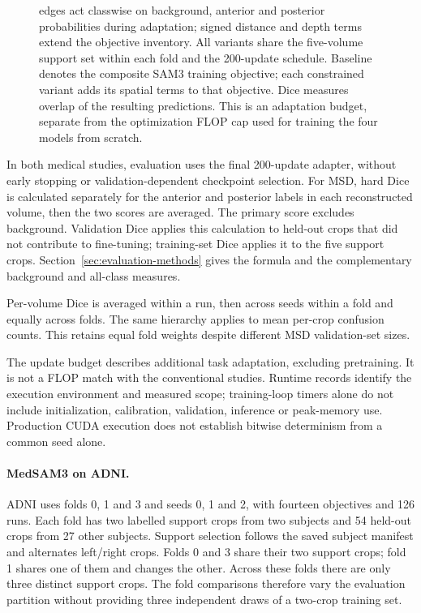 \documentclass[12pt,a4paper]{article}
\begin{document}
\begin{figure}[htbp]
{edges act classwise on background, anterior and posterior probabilities
during adaptation; signed distance and depth terms extend the
objective inventory. All variants share the five-volume support set within each fold and the
200-update schedule. Baseline denotes the composite SAM3 training
objective; each constrained variant adds its spatial terms to that
objective. Dice measures overlap of the resulting predictions. This is
an adaptation budget, separate from the optimization FLOP cap used for
training the four models from scratch.}
\label{fig:medsam3-workflow}
\end{figure}


In both medical studies, evaluation uses the final 200-update adapter,
without early stopping or validation-dependent checkpoint selection.
For MSD, hard Dice is calculated separately for the anterior and
posterior labels in each reconstructed volume, then the two scores are
averaged. The primary score excludes background. Validation Dice applies
this calculation to held-out crops that did not contribute to
fine-tuning; training-set Dice applies it to the five support crops.
Section~\ref{sec:evaluation-methods} gives the formula and the
complementary background and all-class measures.

Per-volume Dice is averaged within a run, then across seeds within a
fold and equally across folds. The same hierarchy applies to mean
per-crop confusion counts. This retains equal fold weights despite
different MSD validation-set sizes.

The update budget describes additional task adaptation, excluding
pretraining. It is not a FLOP match with the conventional studies.
Runtime records identify the execution environment and measured scope;
training-loop timers alone do not include initialization, calibration,
validation, inference or peak-memory use. Production CUDA execution
does not establish bitwise determinism from a common seed alone.

\paragraph{MedSAM3 on ADNI.}
\label{sec:medsam-adni-methods}


ADNI uses folds 0, 1 and 3 and seeds 0, 1 and 2, with fourteen objectives
and 126 runs. Each fold has two labelled support crops from two subjects
and 54 held-out crops from 27 other subjects. Support selection follows
the saved subject manifest and alternates left/right crops. Folds 0 and
3 share their two support crops; fold 1 shares one of them and changes
the other. Across these folds there are only three distinct support
crops. The fold comparisons therefore vary the evaluation partition
without providing three independent draws of a two-crop training set.
\end{document}
